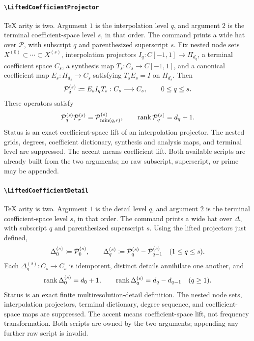 \documentclass[11pt,oneside]{article}
\theoremstyle{definition}
\theoremstyle{remark}
\DeclareRobustCommand{\commandname}[1]{\texttt{\textbackslash#1}}
\DeclareRobustCommand{\localaccentname}[1]{\commandname{#1}}
\begin{document}
\paragraph{\localaccentname{LiftedCoefficientProjector}}
TeX arity is two.  Argument \(1\) is the interpolation level \(q\), and
argument \(2\) is the terminal coefficient-space level \(s\), in that order.
The command prints a wide hat over \(\mathcal P\), with subscript \(q\) and
parenthesized superscript \(s\).  Fix nested node sets
\(X^{(0)}\subset\cdots\subset X^{(s)}\), interpolation projectors
\(I_q:C[-1,1]\to\Pi_{d_q}\), a terminal coefficient space \(C_s\), a synthesis
map \(T_s:C_s\to C[-1,1]\), and a canonical coefficient map
\(E_s:\Pi_{d_s}\to C_s\) satisfying \(T_sE_s=I\) on \(\Pi_{d_s}\).  Then
\[
 \mathcal P_q^{(s)}
 \mathrel{\coloneqq}
 E_sI_qT_s:C_s\longrightarrow C_s,
 \qquad0\le q\le s.
\]
These operators satisfy
\[
 \mathcal P_q^{(s)}\mathcal P_r^{(s)}
 =
 \mathcal P_{\min(q,r)}^{(s)},
 \qquad
 \operatorname{rank}\mathcal P_q^{(s)}=d_q+1.
\]
Status is an exact coefficient-space lift of an interpolation projector.
The nested grids, degrees, coefficient dictionary, synthesis and analysis
maps, and terminal level are suppressed.  The accent means coefficient lift.
Both available scripts are already built from the two arguments; no raw
subscript, superscript, or prime may be appended.

\paragraph{\localaccentname{LiftedCoefficientDetail}}
TeX arity is two.  Argument \(1\) is the detail level \(q\), and argument
\(2\) is the terminal coefficient-space level \(s\), in that order.  The
command prints a wide hat over \(\Delta\), with subscript \(q\) and
parenthesized superscript \(s\).  Using the lifted projectors just defined,
\[
 \Delta_0^{(s)}
 \mathrel{\coloneqq}
 \mathcal P_0^{(s)},
 \qquad
 \Delta_q^{(s)}
 \mathrel{\coloneqq}
 \mathcal P_q^{(s)}-\mathcal P_{q-1}^{(s)}
 \quad(1\le q\le s).
\]
Each \(\Delta_q^{(s)}:C_s\to C_s\) is idempotent, distinct details annihilate
one another, and
\[
 \operatorname{rank}\Delta_0^{(s)}=d_0+1,\qquad
 \operatorname{rank}\Delta_q^{(s)}=d_q-d_{q-1}\quad(q\ge1).
\]
Status is an exact finite multiresolution-detail definition.  The nested node
sets, interpolation projectors, terminal dictionary, degree sequence, and
coefficient-space maps are suppressed.  The accent means coefficient-space
lift, not frequency transformation.  Both scripts are owned by the two
arguments; appending any further raw script is invalid.
\end{document}
